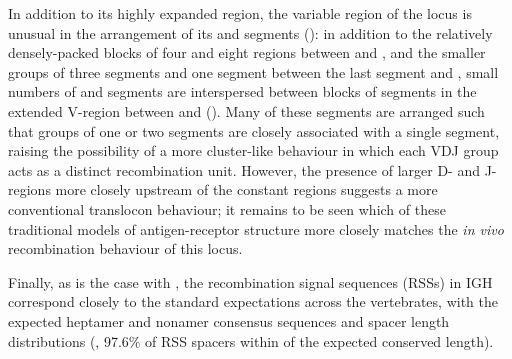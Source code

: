 In addition to its highly expanded \vh region, the variable region of the \Xma locus is unusual in the arrangement of its \dh and \jh segments (): in addition to the relatively densely-packed blocks of four \dh and eight \jh regions between  and , and the smaller groups of three \dh segments and one \jh segment between the last \vh segment and , small numbers of \dh and \jh segments are interspersed between blocks of \vh segments in the extended V-region between  and  (). Many of these segments are arranged such that groups of one or two \dh segments are closely associated with a single \jh segment, raising the possibility of a more cluster-like behaviour in which each VDJ group acts as a distinct recombination unit. However, the presence of larger D- and J-regions more closely upstream of the constant regions suggests a more conventional translocon behaviour; it remains to be seen which of these traditional models of antigen-receptor structure more closely matches the \textit{in vivo} recombination behaviour of this locus.
		
Finally, as is the case with \Nfu, the recombination signal sequences (RSSs) in \Xma IGH correspond closely to the standard expectations across the vertebrates, with the expected heptamer and nonamer consensus sequences and spacer length distributions (, 97.6\% of RSS spacers within  of the expected conserved length).	

